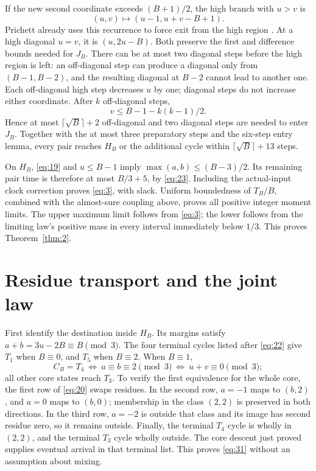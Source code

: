 \documentclass[11pt]{amsart}
\begin{document}
If the new second coordinate exceeds \((B+1)/2\), the high branch with \(u>v\) is \[(u,v)\mapsto(u-1,u+v-B+1).\] Prichett already uses this recurrence to force exit from the high region \cite{Pri}. At a high diagonal \(u=v\), it is \((u,2u-B)\). Both preserve the first and difference bounds needed for \(J_B\). There can be at most two diagonal steps before the high region is left: an off-diagonal step can produce a diagonal only from \((B-1,B-2)\), and the resulting diagonal at \(B-2\) cannot lead to another one. Each off-diagonal high step decreases \(u\) by one; diagonal steps do not increase either coordinate. After \(k\) off-diagonal steps, \[v\le B-1-k(k-1)/2.\] Hence at most \(\lceil\sqrt B\rceil+2\) off-diagonal and two diagonal steps are needed to enter \(J_B\). Together with the at most three preparatory steps and the six-step entry lemma, every pair reaches \(H_B\) or the additional cycle within \(\lceil\sqrt B\rceil+13\) steps.

On \(H_B\), \eqref{eq:19} and \(u\le B-1\) imply \(\max(a,b)\le(B-3)/2\). Its remaining pair time is therefore at most \(B/3+5\), by \eqref{eq:23}. Including the actual-input clock correction proves \eqref{eq:3}, with slack. Uniform boundedness of \(T_B/B\), combined with the almost-sure coupling above, proves all positive integer moment limits. The upper maximum limit follows from \eqref{eq:3}; the lower follows from the limiting law's positive mass in every interval immediately below \(1/3\). This proves Theorem~\ref{thm:2}.

\section{Residue transport and the joint law}

First identify the destination inside \(H_B\). Its margins satisfy \(a+b=3u-2B\equiv B\pmod3\). The four terminal cycles listed after \eqref{eq:22} give \(T_1\) when \(B\equiv0\), and \(T_5\) when \(B\equiv2\). When \(B\equiv1\), \begin{equation}\label{eq:31}
C_B=T_4\ \Longleftrightarrow\ a\equiv b\equiv2\pmod3
          \ \Longleftrightarrow\ u+v\equiv0\pmod3;
\end{equation} all other core states reach \(T_3\). To verify the first equivalence for the whole core, the first row of \eqref{eq:20} swaps residues. In the second row, \(a=-1\) maps to \((b,2)\), and \(a=0\) maps to \((b,0)\); membership in the class \((2,2)\) is preserved in both directions. In the third row, \(a=-2\) is outside that class and its image has second residue zero, so it remains outside. Finally, the terminal \(T_4\) cycle is wholly in \((2,2)\), and the terminal \(T_3\) cycle wholly outside. The core descent just proved supplies eventual arrival in that terminal list. This proves \eqref{eq:31} without an assumption about mixing.
\end{document}
